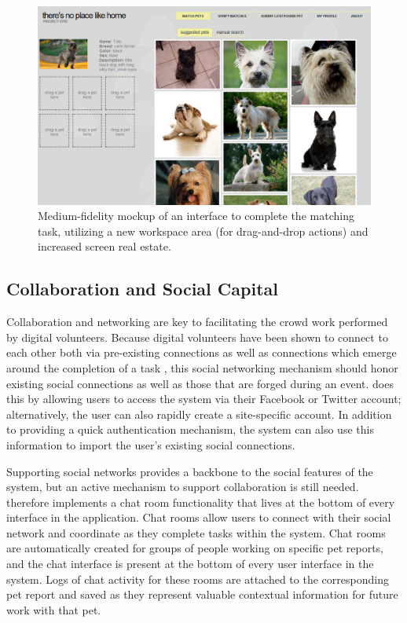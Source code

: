 \begin{figure}[htbp]
    \begin{center}
	\includegraphics[width=150mm]{figs/design4.png}
    \end{center}
        \caption[Fourth Interface Prototype: finding a match for a pet]{
        Medium-fidelity mockup of an interface to complete the matching task, utilizing a new workspace area (for drag-and-drop actions) and increased screen real estate.
	}
	 \label{fig:design4}
\end{figure}

\subsection {Collaboration and Social Capital}

Collaboration and networking are key to facilitating the crowd work performed by digital volunteers.  Because digital volunteers have been shown to connect to each other both via pre-existing connections as well as connections which emerge around the completion of a task \cite{starbird:voluntweeters}, this social networking mechanism should honor existing social connections as well as those that are forged during an event. \nplh{} does this by allowing users to access the system via their Facebook or Twitter account; alternatively, the user can also rapidly create a site-specific account.  In addition to providing a quick authentication mechanism, the system can also use this information to import the user's existing social connections.

Supporting social networks provides a backbone to the social features of the system, but an active mechanism to support collaboration is still needed.  \nplh{} therefore implements a chat room functionality that lives at the bottom of every interface in the application.  Chat rooms allow users to connect with their social network and coordinate as they complete tasks within the system.  Chat rooms are automatically created for groups of people working on specific pet reports, and the chat interface is present at the bottom of every user interface in the system.  Logs of chat activity for these rooms are attached to the corresponding pet report and saved as they represent valuable contextual information for future work with that pet.


